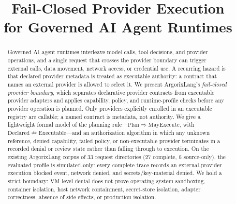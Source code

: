 \documentclass[conference]{IEEEtran}
\newcommand{\Argorix}{%
\textcolor{argViolet}{A}\textcolor{argViolet}{r}\textcolor{argIndigo}{g}\textcolor{argIndigo}{o}\textcolor{argElectric}{r}\textcolor{argElectric}{i}\textcolor{argElectric}{x}\textcolor{argCyan}{L}\textcolor{argCyan}{a}\textcolor{argCyanBright}{n}\textcolor{argCyanBright}{g}\xspace}
\begin{document}
\title{Fail-Closed Provider Execution\\for Governed AI Agent Runtimes}

\author{
}

\maketitle

\begin{abstract}
Governed AI agent runtimes interleave model calls, tool decisions, and provider
operations, and a single request that crosses the provider boundary can trigger external
calls, data movement, network access, or credential use. A recurring hazard is that
declared provider metadata is treated as executable authority: a contract that names an
external provider is allowed to select it. We present \Argorix's \emph{fail-closed
provider boundary}, which separates declarative provider contracts from executable
provider adapters and applies capability, policy, and runtime-profile checks before any
provider operation is planned. Only providers explicitly enrolled in an executable
registry are callable; a named contract is metadata, not authority. We give a lightweight
formal model of the planning rule---$\mathrm{Plan}\Rightarrow\mathrm{MayExecute}$, with
$\mathrm{Declared}\nRightarrow\mathrm{Executable}$---and an authorization algorithm in
which any unknown reference, denied capability, failed policy, or non-executable provider
terminates in a recorded denial or review state rather than falling through to execution.
On the existing \Argorix corpus of 33 request directories (27 complete, 6 source-only),
the evaluated profile is simulated-only: every complete trace records an external-provider
execution blocked event, network denied, and secrets/key-material denied. We hold a strict
boundary: VM-level denial does not prove operating-system sandboxing, container isolation,
host network containment, secret-store isolation, adapter correctness, absence of side
effects, or production isolation.
\end{abstract}
\end{document}
